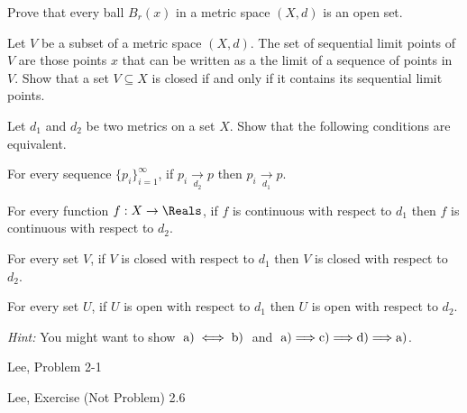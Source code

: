 \documentclass[minion]{homework651}
\newcommand\converges[1]{\mathrel{\mathop{\longrightarrow}\limits_{#1}}}
\begin{document}
\begin{problems}
\problem Prove that every ball $B_r(x)$ in a metric space $(X,d)$ is an open set.

\problem Let $V$ be a subset of a metric space $(X,d)$.  The set of sequential limit
points of $V$ are those points $x$ that can be written as a the limit of a 
sequence of points in $V$.  Show that a set $V\subseteq X$ is closed if and only if
it contains its sequential limit points.

\problem Let $d_1$ and $d_2$ be two metrics on a set $X$.  Show that the following
conditions are equivalent.
\begin{subproblems}
\item For every sequence $\{ p_i\}_{i=1}^\infty$, if $p_i\converges{d_2} p$ 
then $p_i\converges{d_1} p$.
\item For every function $f:X\rightarrow \Reals$, if $f$ is continuous with 
respect to $d_1$ then $f$ is continuous with respect to $d_2$.
\item For every set $V$, if $V$ is closed with respect to $d_1$ then
$V$ is closed with respect to $d_2$.
\item For every set $U$, if $U$ is open with respect to $d_1$ then
$U$ is open with respect to $d_2$.
\end{subproblems}

{\it Hint:} You might want to show $\;{\rm a)} \iff {\rm b)}\;$ and $\;{\rm a)} \Longrightarrow {\rm c)} \Longrightarrow {\rm d)} 
\Longrightarrow {\rm a)}$.

\problem Lee, Problem 2-1

\problem Lee, Exercise (Not Problem) 2.6


\end{problems}
\end{document}
